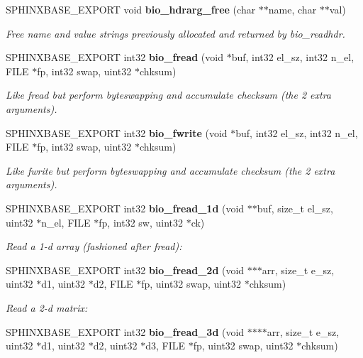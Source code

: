 \begin{DoxyCompactItemize}
\item 
S\-P\-H\-I\-N\-X\-B\-A\-S\-E\-\_\-\-E\-X\-P\-O\-R\-T void {\bf bio\-\_\-hdrarg\-\_\-free} (char $\ast$$\ast$name, char $\ast$$\ast$val)
\begin{DoxyCompactList}\small\item\em Free name and value strings previously allocated and returned by bio\-\_\-readhdr. \end{DoxyCompactList}\item 
S\-P\-H\-I\-N\-X\-B\-A\-S\-E\-\_\-\-E\-X\-P\-O\-R\-T int32 {\bf bio\-\_\-fread} (void $\ast$buf, int32 el\-\_\-sz, int32 n\-\_\-el, F\-I\-L\-E $\ast$fp, int32 swap, uint32 $\ast$chksum)
\begin{DoxyCompactList}\small\item\em Like fread but perform byteswapping and accumulate checksum (the 2 extra arguments). \end{DoxyCompactList}\item 
S\-P\-H\-I\-N\-X\-B\-A\-S\-E\-\_\-\-E\-X\-P\-O\-R\-T int32 {\bf bio\-\_\-fwrite} (void $\ast$buf, int32 el\-\_\-sz, int32 n\-\_\-el, F\-I\-L\-E $\ast$fp, int32 swap, uint32 $\ast$chksum)
\begin{DoxyCompactList}\small\item\em Like fwrite but perform byteswapping and accumulate checksum (the 2 extra arguments). \end{DoxyCompactList}\item 
S\-P\-H\-I\-N\-X\-B\-A\-S\-E\-\_\-\-E\-X\-P\-O\-R\-T int32 {\bf bio\-\_\-fread\-\_\-1d} (void $\ast$$\ast$buf, size\-\_\-t el\-\_\-sz, uint32 $\ast$n\-\_\-el, F\-I\-L\-E $\ast$fp, int32 sw, uint32 $\ast$ck)
\begin{DoxyCompactList}\small\item\em Read a 1-\/d array (fashioned after fread)\-: \end{DoxyCompactList}\item 
S\-P\-H\-I\-N\-X\-B\-A\-S\-E\-\_\-\-E\-X\-P\-O\-R\-T int32 {\bf bio\-\_\-fread\-\_\-2d} (void $\ast$$\ast$$\ast$arr, size\-\_\-t e\-\_\-sz, uint32 $\ast$d1, uint32 $\ast$d2, F\-I\-L\-E $\ast$fp, uint32 swap, uint32 $\ast$chksum)
\begin{DoxyCompactList}\small\item\em Read a 2-\/d matrix\-: \end{DoxyCompactList}\item 
S\-P\-H\-I\-N\-X\-B\-A\-S\-E\-\_\-\-E\-X\-P\-O\-R\-T int32 {\bf bio\-\_\-fread\-\_\-3d} (void $\ast$$\ast$$\ast$$\ast$arr, size\-\_\-t e\-\_\-sz, uint32 $\ast$d1, uint32 $\ast$d2, uint32 $\ast$d3, F\-I\-L\-E $\ast$fp, uint32 swap, uint32 $\ast$chksum)

\end{DoxyCompactItemize}
